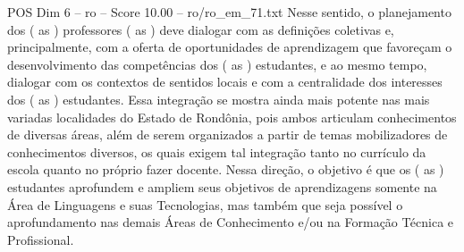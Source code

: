 \begin{textsample}{POS Dim 6 – ro – Score 10.00 – ro/ro\_em\_71.txt}
Nesse sentido, o planejamento dos ( as ) professores ( as ) deve dialogar com as definições coletivas e, principalmente, com a oferta de oportunidades de aprendizagem que favoreçam o desenvolvimento das competências dos ( as ) estudantes, e ao mesmo tempo, dialogar com os contextos de sentidos locais e com a centralidade dos interesses dos ( as ) estudantes.
Essa integração se mostra ainda mais potente nas mais variadas localidades do Estado de Rondônia, pois ambos articulam conhecimentos de diversas áreas, além de serem organizados a partir de temas mobilizadores de conhecimentos diversos, os quais exigem tal integração tanto no currículo da escola quanto no próprio fazer docente.
Nessa direção, o objetivo é que os ( as ) estudantes aprofundem e ampliem seus objetivos de aprendizagens somente na Área de Linguagens e suas Tecnologias, mas também que seja possível o aprofundamento nas demais Áreas de Conhecimento e/ou na Formação Técnica e Profissional.

\end{textsample}
